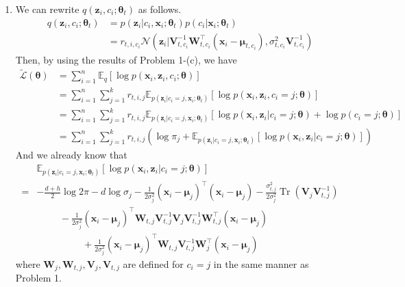 \documentclass[11pt]{article}
\DeclareMathOperator{\tr}{Tr}
\begin{document}
\begin{enumerate}
\begin{enumerate}
    \item
    We can rewrite $q(\bm z_i,c_i;\bm\theta_t)$ as follows.
    \begin{align*}
    q(\bm z_i,c_i;\bm\theta_t) &= p(\bm z_i|c_i,\bm x_i;\bm\theta_t)p(c_i|\bm x_i;\bm\theta_t) \\
    &= r_{t,i,c_i}\mathcal{N}(\bm z_i|\bm V_{t,c_i}^{-1}\bm W_{t,c_i}^{\top}(\bm x_i-\bm\mu_{t,c_i}),\sigma_{t,c_i}^2\bm V_{t,c_i}^{-1})
    \end{align*}
    Then, by using the results of Problem 1-(c), we have
    \begin{align*}
    \tilde{\mathcal{L}}(\bm\theta)
    &= \sum_{i=1}^{n}\mathbb{E}_q[\log p(\bm x_i,\bm z_i,c_i;\bm\theta)] \\
    &= \sum_{i=1}^{n}\sum_{j=1}^{k}r_{t,i,j}\mathbb{E}_{p(\bm z_i|c_i=j,\bm x_i;\bm\theta_t)}[\log p(\bm x_i,\bm z_i,c_i=j;\bm\theta)] \\
    &= \sum_{i=1}^{n}\sum_{j=1}^{k}r_{t,i,j}\mathbb{E}_{p(\bm z_i|c_i=j,\bm x_i;\bm\theta_t)}[\log p(\bm x_i,\bm z_i|c_i=j;\bm\theta)+\log p(c_i=j;\bm\theta)] \\
    &= \sum_{i=1}^{n}\sum_{j=1}^{k}r_{t,i,j}\left(\log\pi_j+\mathbb{E}_{p(\bm z_i|c_i=j,\bm x_i;\bm\theta_t)}[\log p(\bm x_i,\bm z_i|c_i=j;\bm\theta)]\right)
    \end{align*}
    And we already know that
    \begin{align*}
    & \mathbb{E}_{p(\bm z_i|c_i=j,\bm x_i;\bm\theta_t)}[\log p(\bm x_i,\bm z_i|c_i=j;\bm\theta)] \\
    =& -\frac{d+h}{2}\log 2\pi-d\log\sigma_j-\frac{1}{2\sigma_j^2}(\bm x_i-\bm\mu_j)^{\top}(\bm x_i-\bm\mu_j)-\frac{\sigma_{t,j}^2}{2\sigma_j^2}\tr\left(\bm V_j\bm V_{t,j}^{-1}\right) \\
    &\hspace{1cm} -\frac{1}{2\sigma_j^2}(\bm x_i-\bm\mu_j)^{\top}\bm W_{t,j}\bm V_{t,j}^{-1}\bm V_j\bm V_{t,j}^{-1}\bm W_{t,j}^{\top}(\bm x_i-\bm\mu_j) \\
    &\hspace{2cm} +\frac{1}{2\sigma_j^2}(\bm x_i-\bm\mu_j)^{\top}\bm W_{t,j}\bm V_{t,j}^{-1}\bm W_j^{\top}(\bm x_i-\bm\mu_j)
    \end{align*}
    where $\bm W_j, \bm W_{t,j}, \bm V_j, \bm V_{t,j}$ are defined for $c_i=j$ in the same manner as Problem 1.
    

\end{enumerate}
\end{enumerate}
\end{document}
